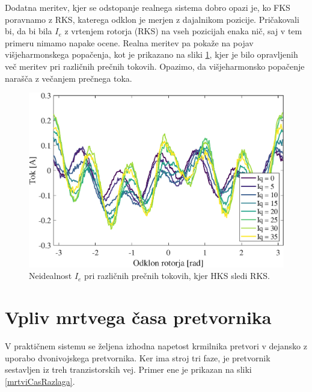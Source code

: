 \documentclass[a4paper,twoside,openright,12pt,slovene]{book}
\begin{document}
Dodatna meritev, kjer se odstopanje realnega sistema dobro opazi je, ko FKS poravnamo z RKS, katerega odklon je merjen z dajalnikom pozicije. Pričakovali bi, da bi bila $I_e$ z vrtenjem rotorja (RKS)
na vseh pozicijah enaka nič, saj v tem primeru nimamo napake ocene. Realna meritev pa pokaže na pojav višjeharmonskega popačenja, kot je prikazano na sliki
\ref{tokovniOdzivIs_HKSslediRKS_diff}, kjer je bilo opravljenih več meritev pri različnih prečnih tokovih. Opazimo, da višjeharmonsko popačenje narašča z večanjem prečnega toka.

\begin{figure}[!htbp]
    \centering
    \includegraphics[width=0.95\columnwidth]{Slike/tokovniOdzivIs_HKSslediRKS_diff.eps}
    \caption{\label{tokovniOdzivIs_HKSslediRKS_diff} Neidealnost $I_e$ pri različnih prečnih tokovih, kjer HKS sledi RKS.}
\end{figure}

\section{Vpliv mrtvega časa pretvornika}

V praktičnem sistemu se željena izhodna napetost krmilnika pretvori v dejansko z uporabo dvonivojskega pretvornika. Ker ima stroj tri faze, je pretvornik sestavljen iz treh tranzistorskih vej. Primer
ene je prikazan na sliki \ref{mrtviCasRazlaga}. 
\end{document}
